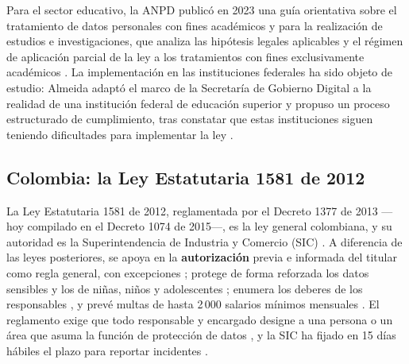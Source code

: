Para el sector educativo, la ANPD publicó en 2023 una guía orientativa sobre el tratamiento de datos personales con fines académicos y para la realización de estudios e investigaciones, que analiza las hipótesis legales aplicables y el régimen de aplicación parcial de la ley a los tratamientos con fines exclusivamente académicos \cite{anpd2023academicos}. La implementación en las instituciones federales ha sido objeto de estudio: Almeida adaptó el marco de la Secretaría de Gobierno Digital a la realidad de una institución federal de educación superior y propuso un proceso estructurado de cumplimiento, tras constatar que estas instituciones siguen teniendo dificultades para implementar la ley \cite{almeida2024lgpd}.

\subsection{Colombia: la Ley Estatutaria 1581 de 2012}
\label{sec:marco_colombia}

La Ley Estatutaria 1581 de 2012, reglamentada por el Decreto 1377 de 2013 ---hoy compilado en el Decreto 1074 de 2015---, es la ley general colombiana, y su autoridad es la Superintendencia de Industria y Comercio (SIC) \cite{colombia2012ley1581,colombia2013decreto1377}. A diferencia de las leyes posteriores, se apoya en la \textbf{autorización} previa e informada del titular como regla general, con excepciones \cite[arts.~9 y 10]{colombia2012ley1581}; protege de forma reforzada los datos sensibles y los de niñas, niños y adolescentes \cite[arts.~5 y 7]{colombia2012ley1581}; enumera los deberes de los responsables \cite[art.~17]{colombia2012ley1581}, y prevé multas de hasta 2\,000 salarios mínimos mensuales \cite[art.~23]{colombia2012ley1581}. El reglamento exige que todo responsable y encargado designe a una persona o un área que asuma la función de protección de datos \cite{colombia2013decreto1377}, y la SIC ha fijado en 15 días hábiles el plazo para reportar incidentes \cite{sic2020incidentes}.

